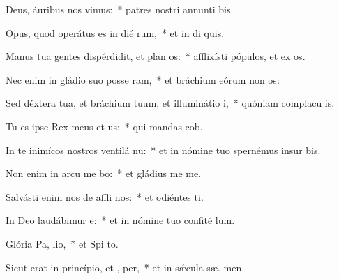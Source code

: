 \item Deus, áuribus nos vimus:~* patres nostri annunti bis.
\item Opus, quod operátus es in dié rum,~* et in di quis.
\item Manus tua gentes dispérdidit, et plan os:~* afflixísti pópulos, et ex os.
\item Nec enim in gládio suo posse ram,~* et bráchium eórum non  os:
\item Sed déxtera tua, et bráchium tuum, et illuminátio  i,~* quóniam complacu  is.
\item Tu es ipse Rex meus et  us:~* qui mandas  cob.
\item In te inimícos nostros ventilá nu:~* et in nómine tuo spernémus insur  bis.
\item Non enim in arcu me bo:~* et gládius me   me.
\item Salvásti enim nos de affli nos:~* et odiéntes  ti.
\item In Deo laudábimur  e:~* et in nómine tuo confité  lum.
\item Glória Pa,  lio,~* et Spi to.
\item Sicut erat in princípio, et ,  per,~* et in sǽcula sæ. men.
